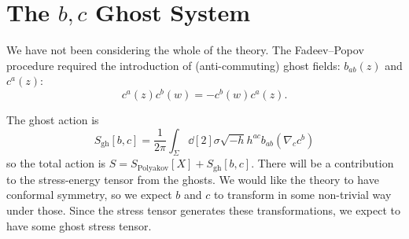 \section{The \texorpdfstring{$b, c$}{b and c} Ghost System}%
\label{sec:the_b_and_c_ghost_system}

We have not been considering the whole of the theory.
The Fadeev--Popov procedure required the introduction of (anti-commuting) ghost fields: $b_{ab}(z)$ and $c^{a}(z)$:
\begin{equation}
  c^{a}(z) c^{b}(w) = -c^{b}(w) c^{a}(z).
\end{equation}

The ghost action is
\begin{equation}
  S_{\text{gh}}[b, c] = \frac{1}{2 \pi} \int_{\Sigma} \dd[2]{\sigma} \sqrt{-h} h^{ac} b_{ab} (\nabla_{c} c^{b})
\end{equation}
so the total action is $S = S_{\text{Polyakov}}[X] + S_{\text{gh}}[b, c]$. There will be a contribution to the stress-energy tensor from the ghosts.
We would like the theory to have conformal symmetry, so we expect $b$ and $c$ to transform in some non-trivial way under those. Since the stress tensor generates these transformations, we expect to have some ghost stress tensor.

